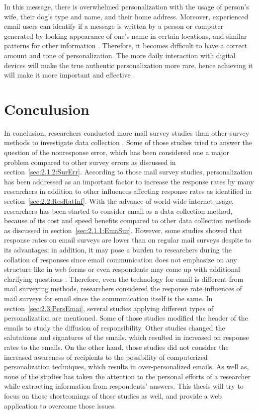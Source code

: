 In this message, there is overwhelmed personalization with the usage of person's wife, their dog's type and name, and their home address. Moreover, experienced email users can identify if a message is written by a person or computer generated by looking appearance of one's name in certain locations, and similar patterns for other information \citep[page 272]{DillmanDonA.SmythJoleneD.Christian2009}. Therefore, it becomes difficult to have a correct amount and tone of personalization. The more daily interaction with digital devices will make the true authentic personalization more rare, hence achieving it will make it more important and effective \citep[page 238]{DillmanDonA.SmythJoleneD.Christian2009}.

\section{Conculusion}
\label{sec:2.4:Conc}

In conclusion, researchers conducted more mail survey studies than other survey methods to investigate data collection \citep{Dillman1991}. Some of those studies tried to answer the question of the nonresponse error, which has been considered one a major problem compared to other survey errors as discussed in section~\ref{sec:2.1.2:SurErr}. According to those mail survey studies, personalization has been addressed as an important factor to increase the response rates by many researchers in addition to other influences affecting response rates as identified in section~\ref{sec:2.2:ResRatInf}. With the advance of world-wide internet usage, researchers has been started to consider email as a data collection method, because of its cost and speed benefits compared to other data collection methods as discussed in section~\ref{sec:2.1.1:EmaSur}. However, some studies showed that response rates on email surveys are lower than on regular mail surveys despite to its advantages; in addition, it may pose a burden to researchers during the collation of responses since email communication does not emphasize on any structure like in web forms or even respondents may come up with additional clarifying questions \citep{Selm2006}. Therefore, even the technology for email is different from mail surveying methods, researchers considered the response rate influences of mail surveys for email since the communication itself is the same. In section~\ref{sec:2.3:PersEmai}, several studies applying different types of personalization are mentioned. Some of those studies modified the header of the emails to study the diffusion of responsibility. Other studies changed the salutations and signatures of the emails, which resulted in increased on response rates to the emails. On the other hand, those studies did not consider the increased awareness of recipients to the possibility of computerized personalization techniques, which results in over-personalized emails. As well as, none of the studies has taken the attention to the personal efforts of a researcher while extracting information from respondents' answers. This thesis will try to focus on those shortcomings of those studies as well, and provide a web application to overcome those issues.
\vspace{1cm}

